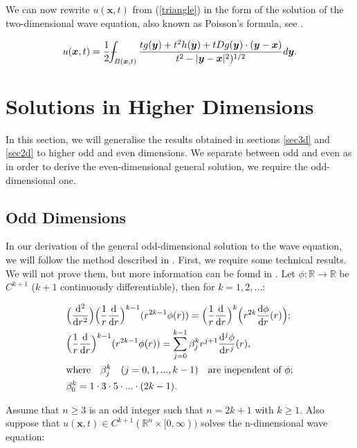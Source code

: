 \documentclass[a4paper, 12pt]{article}
\def\Xint#1{\mathchoice
{\XXint\displaystyle\textstyle{#1}}%
{\XXint\textstyle\scriptstyle{#1}}%
{\XXint\scriptstyle\scriptscriptstyle{#1}}%
{\XXint\scriptscriptstyle\scriptscriptstyle{#1}}%
\!\int}
\def\XXint#1#2#3{{\setbox0=\hbox{$#1{#2#3}{\int}$ }
\vcenter{\hbox{$#2#3$ }}\kern-.6\wd0}}
\def\dashint{\Xint-}
\numberwithin{equation}{section}
\begin{document}
We can now rewrite $u(\boldsymbol{x},t)$ from (\ref{triangle}) in the form of the solution of the two-dimensional wave equation, also known as Poisson's formula, see \cite{Ev}.
 
\begin{equation*}
    u(\boldsymbol{x},t)=\frac{1}{2}\dashint_{B(\boldsymbol{x},t)} \frac{tg(\boldsymbol{y})+t^2h(\boldsymbol{y})+tDg(\boldsymbol{y})\cdot (\boldsymbol{y}-\boldsymbol{x})}{t^2-|\boldsymbol{y}-\boldsymbol{x}|^2)^{1/2}}d\boldsymbol{y}.
\end{equation*}

\section{Solutions in Higher Dimensions}

In this section, we will generalise the results obtained in sections \ref{sec3d} and \ref{sec2d} to higher odd and even dimensions. We separate between odd and even as 
in order to derive the even-dimensional general solution, we require the odd-dimensional one.

\subsection{Odd Dimensions}

In our derivation of the general odd-dimensional solution to the wave equation, we will follow the method described in \cite{Ev}. First, we require some technical 
results. We will not prove them, but more information can be found in \cite[Lemma 2]{Ev}. Let $\phi:\mathbb{R} \to \mathbb{R}$ be $C^{k+1}$ ($k+1$ continuously differentiable), 
then for $k=1, 2, ...$:

\begin{align}
    &\Big(\diff[2]{}{r}\Big)\Big( \frac{1}{r} \diff{}{r}\Big)^{k-1}(r^{2k-1}\phi(r))=\Big( \frac{1}{r} \diff{}{r}\Big)^k \Big(r^{2k} \diff{\phi}{r}(r) \Big); \label{i} \\
    &\Big( \frac{1}{r} \diff{}{r}\Big)^{k-1}(r^{2k-1}\phi(r))=\sum^{k-1}_{j=0} \beta_{j}^{k} r^{j+1} \diff[j]{\phi}{r}(r), \label{ii} \\
    & \textrm{where} \quad \beta_{j}^{k} \quad (j=0,1,...,k-1) \quad \textrm{are inependent of $\phi$}; \notag \\
    & \beta_{0}^{k}=1 \cdot 3 \cdot 5 \cdot ... \cdot (2k-1). \label{iii}
\end{align}

Assume that $n \ge 3$ is an odd integer such that $n=2k+1$ with $k \ge 1$. Also suppose that $u(\boldsymbol{x},t) \in C^{k+1}(\mathbb{R}^n \times [0, \infty))$ solves the 
n-dimensional wave equation:
\end{document}

